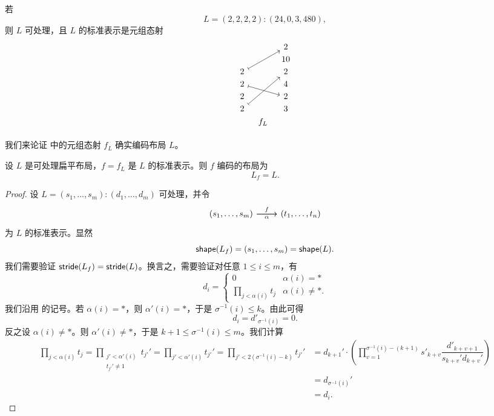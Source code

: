 \begin{example}
    若
    \[L = (2,2,2,2):(24,0,3,480),\]
    则 $L$ 可处理，且 $L$ 的标准表示是元组态射
    \[ \begin{tikzcd} [row sep = 1, column sep = 8]
     & & 2 \\
     & & 10 \\
    2 \ar[uurr,mapsto]& & 2 \\
    2 \ar[drr,mapsto]& & 4 \\
    2 & & 2 \\
    2 \ar[uuurr,mapsto] & & 3 \\
    & f_L & \\
    \end{tikzcd} \]
\end{example}

我们来论证  中的元组态射 $f_L$ 确实编码布局 $L$。

\begin{lemma}\label{tuplemorphismfromlayoutagreement}
设 $L$ 是可处理扁平布局，$f = f_L$ 是 $L$ 的标准表示。则 $f$ 编码的布局为
\[
L_{f} = L.
\]
\end{lemma}
\begin{proof} 设 $L = (s_1,\dots,s_m):(d_1,\dots,d_m)$ 可处理，并令
\[ \begin{tikzcd}
(s_1,\dots,s_m) \ar[r,"f"] \ar[r,swap,"\alpha"] &  (t_1,\dots,t_n)
\end{tikzcd} \]
为 $L$ 的标准表示。显然
\[
\mathsf{shape}(L_f) = (s_1,\dots,s_m) = \mathsf{shape}(L).
\]
我们需要验证 $\mathsf{stride}(L_f) = \mathsf{stride}(L)$。换言之，需要验证对任意 $1 \leq i \leq m$，有
\[
d_i =
\begin{cases}
0 & \alpha(i) = *\\
\prod_{j < \alpha(i)} t_j & \alpha(i) \neq *.
\end{cases}
\]
我们沿用  的记号。若 $\alpha(i) = *$，则 $\alpha'(i) = *$，于是 $\sigma^{-1}(i) \leq k$。由此可得
\[
d_i = d'_{\sigma^{-1}(i)} = 0.
\]
反之设 $\alpha(i) \neq *$。则 $\alpha'(i) \neq *$，于是 $k+1 \leq \sigma^{-1}(i) \leq m$。我们计算
\begin{align*}
\prod_{j < \alpha(i)} t_j = \prod_{\substack{j' < \alpha'(i)\\ t_{j'}' \neq 1} } t_{j'}' = \prod_{j' < \alpha'(i)} t_{j'}' = \prod_{j' < 2(\sigma^{-1}(i)-k)}t_{j'}' & = d_{k+1}' \cdot \left( \prod_{v = 1}^{\sigma^{-1}(i)-(k+1)} s'_{k+v} \dfrac{d'_{k+v+1}}{s_{k+v}'d_{k+v}'} \right)\\
& = d_{\sigma^{-1}(i)}'\\
& = d_i.
\end{align*}
\end{proof}

